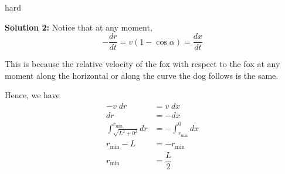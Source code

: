 \begin{solution}{hard}
\tcbline

\textbf{Solution 2:} Notice that at any moment,
$$-\frac{dr}{dt} = v (1-\cos{\alpha}) = \frac{dx}{dt}$$

This is because the relative velocity of the fox with respect to the fox at any moment along the horizontal or along the curve the dog follows is the same. \vspace{3mm}

Hence, we have
\begin{align*}
-v \;dr &= v \;dx\\
dr &= -dx \\
\int_{\sqrt{L^2+0^2}}^{r_{\text{min}}}{dr} &= -\int_{r_{\text{min}}}^{0}{dx}\\
r_{\text{min}} - L &= - r_{\text{min}} \\
r_{\text{min}} &= \boxed{\dfrac{L}{2}}
\end{align*}
\end{solution}
